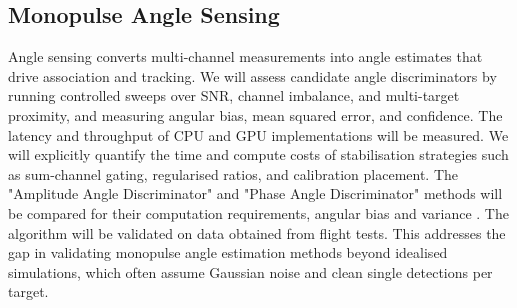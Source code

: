 \subsection{Monopulse Angle Sensing}
Angle sensing converts multi-channel measurements into angle estimates that drive association and tracking. We will assess candidate angle discriminators by running controlled sweeps over SNR, channel imbalance, and multi-target proximity, and measuring angular bias, mean squared error, and confidence. The latency and throughput of CPU and GPU implementations will be measured. We will explicitly quantify the time and compute costs of stabilisation strategies such as sum-channel gating, regularised ratios, and calibration placement. The "Amplitude Angle Discriminator" and "Phase Angle Discriminator" methods will be compared for their computation requirements, angular bias and variance \cite{mitll_radar_lecture9_tracking_2008}. The algorithm will be validated on data obtained from flight tests. This addresses the gap in validating monopulse angle estimation methods beyond idealised simulations, which often assume Gaussian noise and clean single detections per target.  


